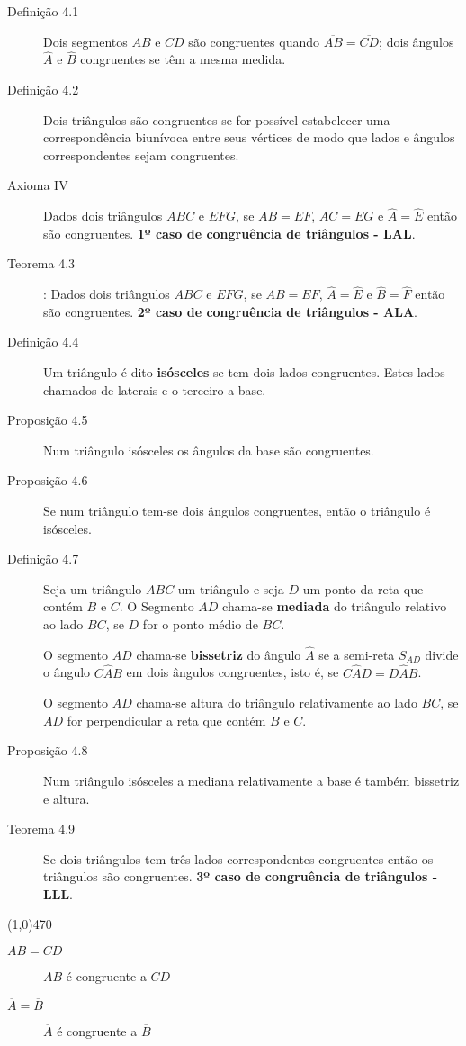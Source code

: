 \documentclass[11pt]{article}
\begin{document}
\begin{description}
  \item[Definição 4.1] Dois segmentos $AB$ e $CD$ são congruentes quando
    $\overline{AB} = \overline{CD}$; dois ângulos $\hat{A}$ e $\hat{B}$
    congruentes se têm a mesma medida.

  \item[Definição 4.2] Dois triângulos são congruentes se for possível
    estabelecer uma correspondência biunívoca entre seus vértices de modo que
    lados e ângulos correspondentes sejam congruentes.

  \item[Axioma IV] Dados dois triângulos $ABC$ e $EFG$, se $AB = EF$, $AC = EG$
    e $\hat{A} = \hat{E}$ então são congruentes.
    \textbf{1º caso de congruência de triângulos - LAL}.

  \item[Teorema 4.3]: Dados dois triângulos $ABC$ e $EFG$, se $AB = EF$,
    $\hat{A} = \hat{E}$ e $\hat{B} = \hat{F}$ então são congruentes.
    \textbf{2º caso de congruência de triângulos - ALA}.

  \item[Definição 4.4] Um triângulo é dito \textbf{isósceles} se tem dois lados
    congruentes. Estes lados chamados de laterais e o terceiro a base.

  \item[Proposição 4.5] Num triângulo isósceles os ângulos da base são
    congruentes.

  \item[Proposição 4.6] Se num triângulo tem-se dois ângulos congruentes,
    então o triângulo é isósceles.

  \item[Definição 4.7] Seja um triângulo $ABC$ um triângulo e seja $D$ um ponto
    da reta que contém $B$ e $C$. O Segmento $AD$ chama-se \textbf{mediada}
    do triângulo relativo ao lado $BC$, se $D$ for o ponto médio de $BC$.

    O segmento $AD$ chama-se \textbf{bissetriz} do ângulo $\hat{A}$ se a
    semi-reta $S_{AD}$ divide o ângulo $C\hat{A}B$ em dois ângulos
    congruentes, isto é, se $C\hat{A}D = D\hat{A}B$.

    O segmento $AD$ chama-se altura do triângulo relativamente ao lado $BC$, se
    $AD$ for perpendicular a reta que contém $B$ e $C$.

  \item[Proposição 4.8] Num triângulo isósceles a mediana relativamente a base
    é também bissetriz e altura.

  \item[Teorema 4.9] Se dois triângulos tem três lados correspondentes
    congruentes então os triângulos são congruentes.
    \textbf{3º caso de congruência de triângulos - LLL}.
\end{description}

\line(1,0){470}

\begin{description}
  \item[$AB = CD$] $AB$ é congruente a $CD$
  \item[$\overline{A} = \overline{B}$] $\overline{A}$ é congruente a
    $\overline{B}$
\end{description}
\end{document}
